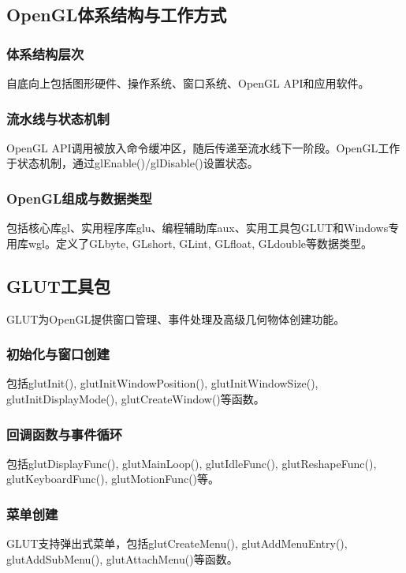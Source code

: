 \documentclass[12pt]{article}
\begin{document}
\subsection{OpenGL体系结构与工作方式}

\subsubsection{体系结构层次}
自底向上包括图形硬件、操作系统、窗口系统、OpenGL API和应用软件。

\subsubsection{流水线与状态机制}
OpenGL API调用被放入命令缓冲区，随后传递至流水线下一阶段。OpenGL工作于状态机制，通过glEnable()/glDisable()设置状态。

\subsubsection{OpenGL组成与数据类型}
包括核心库gl、实用程序库glu、编程辅助库aux、实用工具包GLUT和Windows专用库wgl。定义了GLbyte, GLshort, GLint, GLfloat, GLdouble等数据类型。

\subsection{GLUT工具包}

GLUT为OpenGL提供窗口管理、事件处理及高级几何物体创建功能。

\subsubsection{初始化与窗口创建}
包括glutInit(), glutInitWindowPosition(), glutInitWindowSize(), glutInitDisplayMode(), glutCreateWindow()等函数。

\subsubsection{回调函数与事件循环}
包括glutDisplayFunc(), glutMainLoop(), glutIdleFunc(), glutReshapeFunc(), glutKeyboardFunc(), glutMotionFunc()等。

\subsubsection{菜单创建}
GLUT支持弹出式菜单，包括glutCreateMenu(), glutAddMenuEntry(), glutAddSubMenu(), glutAttachMenu()等函数。
\end{document}
